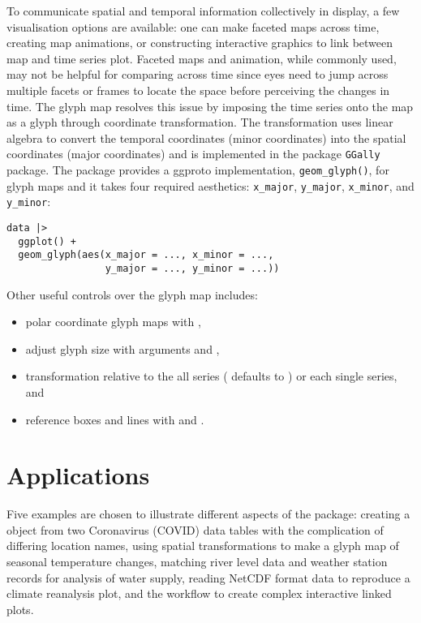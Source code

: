 \documentclass[
  shortnames]{jss}
\providecommand{\tightlist}{%
  \setlength{\itemsep}{0pt}\setlength{\parskip}{0pt}}
\begin{document}
To communicate spatial and temporal information collectively in display, a few visualisation options are available: one can make faceted maps across time, creating map animations, or constructing interactive graphics to link between map and time series plot. Faceted maps and animation, while commonly used, may not be helpful for comparing across time since eyes need to jump across multiple facets or frames to locate the space before perceiving the changes in time. The glyph map \citep{Wickham2012-yr} resolves this issue by imposing the time series onto the map as a glyph through coordinate transformation. The transformation uses linear algebra to convert the temporal coordinates (minor coordinates) into the spatial coordinates (major coordinates) and is implemented in the package \texttt{GGally} \citep{ggally} package. The  package provides a ggproto implementation, \texttt{geom\_glyph()}, for glyph maps and it takes four required aesthetics: \texttt{x\_major}, \texttt{y\_major}, \texttt{x\_minor}, and \texttt{y\_minor}:

\begin{verbatim}
data |> 
  ggplot() +
  geom_glyph(aes(x_major = ..., x_minor = ..., 
                 y_major = ..., y_minor = ...))
\end{verbatim}

Other useful controls over the glyph map includes:

\begin{itemize}
\tightlist
\item
  polar coordinate glyph maps with ,
\item
  adjust glyph size with arguments  and ,
\item
  transformation relative to the all series ( defaults to ) or each single series, and
\item
  reference boxes and lines with  and .
\end{itemize}

\hypertarget{examples}{%
\section{Applications}\label{examples}}

Five examples are chosen to illustrate different aspects of the  package: creating a  object from two Coronavirus (COVID) data tables with the complication of differing location names, using spatial transformations to make a glyph map of seasonal temperature changes, matching river level data and weather station records for analysis of water supply, reading NetCDF format data to reproduce a climate reanalysis plot, and the workflow to create complex interactive linked plots.
\end{document}
